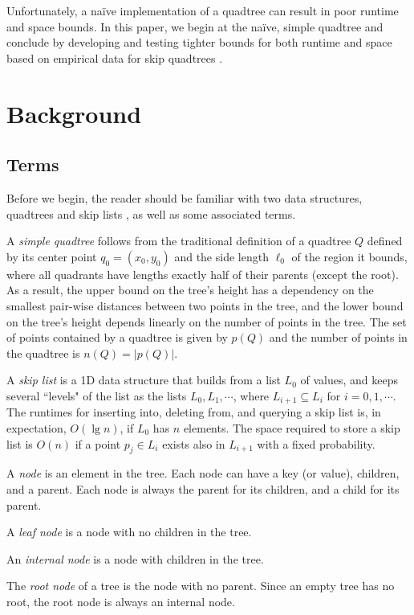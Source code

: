 \documentclass[12pt]{article}
\begin{document}
        Unfortunately, a na\"ive implementation of a quadtree can result in poor runtime and space bounds. In this paper, we begin at the na\"ive, simple quadtree and conclude by developing and testing tighter bounds for both runtime and space based on empirical data for skip quadtrees \cite{sqt}.

    \section{Background}
    \subsection{Terms}
        Before we begin, the reader should be familiar with two data structures, quadtrees \cite{qt} and skip lists \cite{sl}, as well as some associated terms.
        
        A \textit{simple quadtree} follows from the traditional definition of a quadtree $Q$ defined by its center point $q_0 = (x_0, y_0)$ and the side length $\ell_0$ of the region it bounds, where all quadrants have lengths exactly half of their parents (except the root). As a result, the upper bound on the tree's height has a dependency on the smallest pair-wise distances between two points in the tree, and the lower bound on the tree's height depends linearly on the number of points in the tree. The set of points contained by a quadtree is given by $p(Q)$ and the number of points in the quadtree is $n(Q) = |p(Q)|$.
        
        A \textit{skip list} is a 1D data structure that builds from a list $L_0$ of values, and keeps several ``levels" of the list as the lists $L_0, L_1, \cdots$, where $L_{i+1} \subseteq L_i$ for $i = 0, 1, \cdots$. The runtimes for inserting into, deleting from, and querying a skip list is, in expectation, $O(\lg n)$, if $L_0$ has $n$ elements. The space required to store a skip list is $O(n)$ if a point $p_j \in L_i$ exists also in $L_{i+1}$ with a fixed probability.
        
        A \textit{node} is an element in the tree. Each node can have a key (or value), children, and a parent. Each node is always the parent for its children, and a child for its parent.
        
        A \textit{leaf node} is a node with no children in the tree.
        
        An \textit{internal node} is a node with children in the tree.
        
        The \textit{root node} of a tree is the node with no parent. Since an empty tree has no root, the root node is always an internal node.
        
\end{document}
